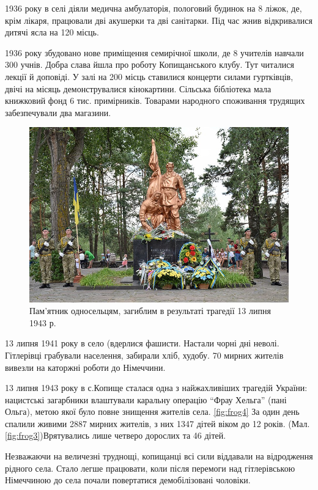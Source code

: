 1936 року в селі діяли медична амбулаторія, пологовий будинок на 8 ліжок, де, крім лікаря, працювали дві акушерки та дві санітарки. Під час жнив відкривалися дитячі ясла на 120 місць.

1936 року збудовано нове приміщення семирічної школи, де 8 учителів навчали 300 учнів. Добра слава йшла про роботу Копищанського клубу. Тут читалися лекції й доповіді. У залі на 200 місць ставилися концерти силами гуртківців, двічі на місяць демонструвалися кінокартини. Сільська бібліотека мала книжковий фонд 6 тис. примірників. Товарами народного споживання трудящих забезпечували два магазини.
\begin{figure}[h]
	
	\centering
	
	\includegraphics[width=0.8\linewidth]{0.jpg}
	
	\caption{\label{fig:frog3}Пам'ятник односельцям, загиблим в результаті трагедії 13 липня 1943 р.}
	
	\label{fig:mpr}
	
\end{figure}

13 липня 1941 року в село (вдерлися фашисти. Настали чорні дні неволі. Гітлерівці грабували населення, забирали хліб, худобу. 70 мирних жителів вивезли на каторжні роботи до Німеччини.

13 липня 1943 року в с.Копище сталася одна з найжахливіших трагедій України: нацистські загарбники влаштували каральну операцію “Фрау Хельга” (пані Ольга), метою якої було повне знищення жителів села. \ref{fig:frog4} За один день спалили живими 2887 мирних жителів, з них 1347 дітей віком до 12 років. (Мал. \ref{fig:frog3})Врятувались лише четверо дорослих та 46 дітей.

Незважаючи на величезні труднощі, копищанці всі сили віддавали на відродження рідного села. Стало легше працювати, коли після перемоги над гітлерівською Німеччиною до села почали повертатися демобілізовані чоловіки.

